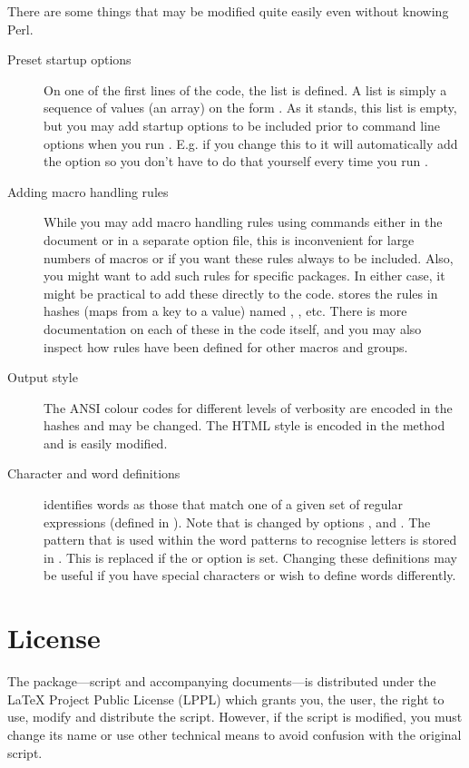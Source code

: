 \documentclass{article}
\begin{document}
There are some things that may be modified quite easily even without knowing Perl.

\begin{description}

\item[Preset startup options]On one of the first lines of the code, the list  is defined. A list is simply a sequence of values (an array) on the form . As it stands, this list is empty, but you may add startup options to be included prior to command line options when you run \TeXcount{}. E.g. if you change this to  it will automatically add the  option so you don't have to do that yourself every time you run \TeXcount{}.

\item[Adding macro handling rules]While you may add macro handling rules using  commands either in the document or in a separate option file, this is inconvenient for large numbers of macros or if you want these rules always to be included. Also, you might want to add such rules for specific packages. In either case, it might be practical to add these directly to the \TeXcount{} code. \TeXcount{} stores the rules in hashes (maps from a key to a value) named , , etc. There is more documentation on each of these in the code itself, and you may also inspect how rules have been defined for other macros and groups.

\item[Output style]The ANSI colour codes for different levels of verbosity are encoded in the  hashes and may be changed. The HTML style is encoded in the method  and is easily modified. 

\item[Character and word definitions]\TeXcount{} identifies words as those that match one of a given set of regular expressions (defined in ). Note that  is changed by options ,  and  . The pattern that is used within the word patterns to recognise letters is stored in . This is replaced if the  or  option is set. Changing these definitions may be useful if you have special characters or wish to define words differently.

\end{description}


\section{License}

The \TeXcount{} package---script and accompanying documents---is distributed
under the \LaTeX{} Project Public License (LPPL)
which grants you, the user, the right to use, modify and distribute
the script. However, if the script is modified, you must change its
name or use other technical means to avoid confusion with the original script.
\end{document}
